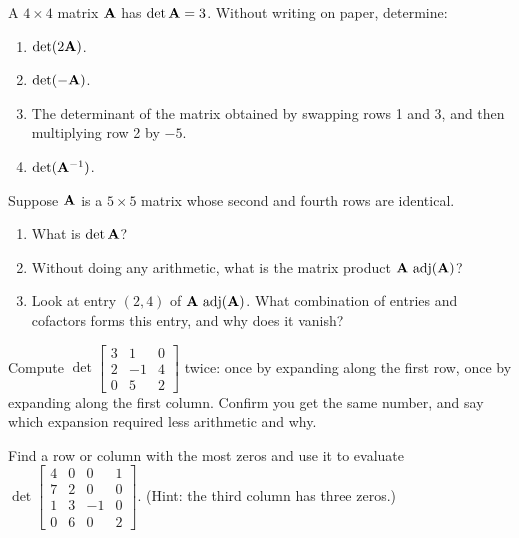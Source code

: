 \begin{exercise}\label{ch22:ex-mental-scaling}
A $4\times4$ matrix $\mathbf{A}$ has $\det\mathbf{A} = 3$. Without writing on paper, determine:
\begin{enumerate}[label=(\alph*)]
\item $\det(2\mathbf{A})$.
\item $\det(-\mathbf{A})$.
\item The determinant of the matrix obtained by swapping rows 1 and 3, and then multiplying row 2 by $-5$.
\item $\det(\mathbf{A}^{-1})$.
\end{enumerate}
\end{exercise}

\begin{exercise}\label{ch22:ex-mental-repeated}
Suppose $\mathbf{A}$ is a $5\times5$ matrix whose second and fourth rows are identical.
\begin{enumerate}[label=(\alph*)]
\item What is $\det\mathbf{A}$?
\item Without doing any arithmetic, what is the matrix product $\mathbf{A}\,\operatorname{adj}(\mathbf{A})$?
\item Look at entry $(2,4)$ of $\mathbf{A}\,\operatorname{adj}(\mathbf{A})$. What combination of entries and cofactors forms this entry, and why does it vanish?
\end{enumerate}
\end{exercise}

\begin{exercise}\label{ch22:ex-warmup-expand}
Compute $\det\begin{bmatrix} 3 & 1 & 0 \\ 2 & -1 & 4 \\ 0 & 5 & 2\end{bmatrix}$ twice: once by
expanding along the first row, once by expanding along the first column. Confirm you get the same
number, and say which expansion required less arithmetic and why.
\end{exercise}

\begin{exercise}\label{ch22:ex-zeros}
Find a row or column with the most zeros and use it to evaluate
$\det\begin{bmatrix} 4 & 0 & 0 & 1 \\ 7 & 2 & 0 & 0 \\ 1 & 3 & -1 & 0 \\ 0 & 6 & 0 & 2\end{bmatrix}$.
(Hint: the third column has three zeros.)
\end{exercise}

